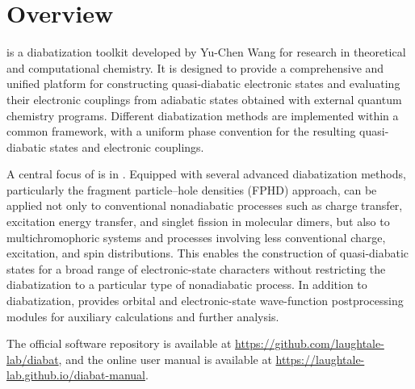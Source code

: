 \section{Overview}
\progname{} is a diabatization toolkit developed by Yu-Chen Wang for research in theoretical and computational chemistry.
It is designed to provide a comprehensive and unified platform for constructing quasi-diabatic electronic states and evaluating their electronic couplings from adiabatic states obtained with external quantum chemistry programs.
Different diabatization methods are implemented within a common framework, with a uniform phase convention for the resulting quasi-diabatic states and electronic couplings.

A central focus of \progname{} is  in .
Equipped with several advanced diabatization methods, particularly the fragment particle--hole densities (FPHD) approach, \progname{} can be applied not only to conventional nonadiabatic processes such as charge transfer, excitation energy transfer, and singlet fission in molecular dimers, but also to multichromophoric systems and processes involving less conventional charge, excitation, and spin distributions.
This enables the construction of quasi-diabatic states for a broad range of electronic-state characters without restricting the diabatization to a particular type of nonadiabatic process.
In addition to diabatization, \progname{} provides orbital and electronic-state wave-function postprocessing modules for auxiliary calculations and further analysis.

The official software repository is available at \url{https://github.com/laughtale-lab/diabat}, and the online user manual is available at
\url{https://laughtale-lab.github.io/diabat-manual}.
